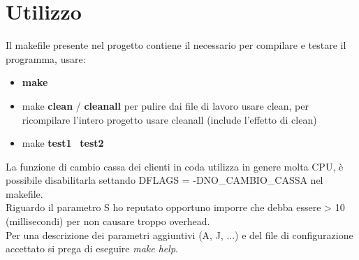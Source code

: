 \documentclass[11pt, a4paper]{article}
\begin{document}
\section{Utilizzo}
Il makefile presente nel progetto contiene il necessario per compilare e testare il programma, usare:
\begin{itemize}
\item \textbf{make}
\item make \textbf{clean} / \textbf{cleanall} per pulire dai file di lavoro usare clean, per ricompilare l'intero progetto usare cleanall (include l'effetto di clean)
\item make \textbf{test1} \ \textbf{test2}
\end{itemize}
La funzione di cambio cassa dei clienti in coda utilizza in genere molta CPU, è possibile disabilitarla settando DFLAGS = -DNO\_CAMBIO\_CASSA nel makefile.\\
Riguardo il parametro S ho reputato opportuno imporre che debba essere > 10 (millisecondi) per non causare troppo overhead.\\
Per una descrizione dei parametri aggiuntivi (A, J, ...) e del file di configurazione accettato si prega di eseguire \textit{make help}.
\end{document}
